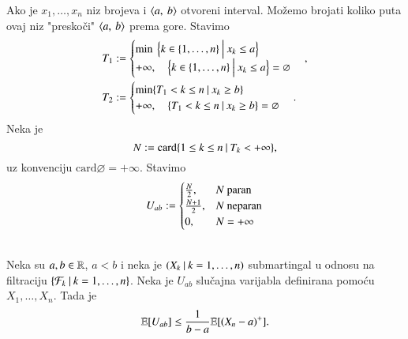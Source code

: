Ako je $x_1, \ldots, x_n$ niz brojeva i $\langle {a}, \: {b} \rangle$ otvoreni interval.
Mo\v zemo brojati koliko puta ovaj niz "presko\v ci" $\langle {a}, \: {b} \rangle$ prema gore.
Stavimo
\begin{equation*}
    \begin{aligned}
        T_1 &:=
        \begin{cases}
            \min \: \Big\{{k \in \{1, \ldots, n\}} \: \Big| \: { x_k \leq a}\Big\}\\
            +\infty, \quad \Big\{{k \in \{1, \ldots, n\}} \: \Big| \: { x_k \leq a}\Big\} = \varnothing
        \end{cases},\\
        T_2 &:=
        \begin{cases}
            \min \{{ T_1 < k \leq n} \: | \: { x_k \geq b}\}\\
            +\infty, \quad \{{T_1 < k \leq n} \: | \: { x_k \geq b}\} = \varnothing
        \end{cases}.
    \end{aligned}
\end{equation*}
Neka je
\begin{equation*}
    N := \mathrm{card} \{{1 \leq k \leq n} \: | \: {T_k < +\infty}\},
\end{equation*}
uz konvenciju $\mathrm{card} \varnothing = +\infty$.
Stavimo
\begin{equation*}
    U_{a b} :=
    \begin{cases}
        \frac{N}{2},& N \textnormal{ paran}\\
        \frac{N + 1}{2},& N \textnormal{ neparan}\\
        0,& N = +\infty
    \end{cases}
\end{equation*}

\begin{tm}    \label{tm:24.2}
    \quad \\
    Neka su $a, b \in \mathbb{R}$, $a < b$ i neka je $({X_k} \: | \: {k = 1, \ldots, n})$ submartingal u odnosu na filtraciju $\{{\mathcal{F}_k} \: | \: {k = 1, \ldots, n}\}$.
    Neka je $U_{a b}$ slu\v cajna varijabla definirana pomo\' cu $X_1, \ldots, X_n$.
    Tada je
    \begin{equation*}
        \mathbb{E} [U_{a b}] \leq \frac{1}{b - a} \mathbb{E} [(X_n - a)^+].
    \end{equation*}
\end{tm}

